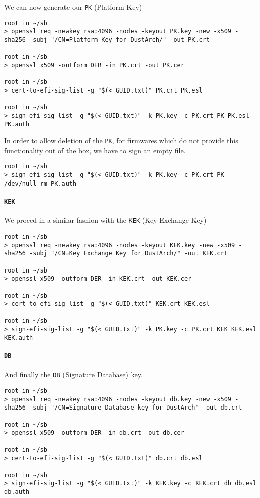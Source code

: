 \documentclass[10pt]{dustdoc}
\begin{document}
We can now generate our \texttt{PK} (Platform Key)

\begin{verbatim}
root in ~/sb
> openssl req -newkey rsa:4096 -nodes -keyout PK.key -new -x509 -sha256 -subj "/CN=Platform Key for DustArch/" -out PK.crt

root in ~/sb
> openssl x509 -outform DER -in PK.crt -out PK.cer

root in ~/sb
> cert-to-efi-sig-list -g "$(< GUID.txt)" PK.crt PK.esl

root in ~/sb
> sign-efi-sig-list -g "$(< GUID.txt)" -k PK.key -c PK.crt PK PK.esl PK.auth
\end{verbatim}


In order to allow deletion of the \texttt{PK}, for firmwares which do not provide this functionality out of the box, we have to sign an empty file.

\begin{verbatim}
root in ~/sb
> sign-efi-sig-list -g "$(< GUID.txt)" -k PK.key -c PK.crt PK /dev/null rm_PK.auth
\end{verbatim}


\paragraph{\texttt{KEK}}%
\label{par:kek}

We proced in a similar fashion with the \texttt{KEK} (Key Exchange Key)

\begin{verbatim}
root in ~/sb
> openssl req -newkey rsa:4096 -nodes -keyout KEK.key -new -x509 -sha256 -subj "/CN=Key Exchange Key for DustArch/" -out KEK.crt

root in ~/sb
> openssl x509 -outform DER -in KEK.crt -out KEK.cer

root in ~/sb
> cert-to-efi-sig-list -g "$(< GUID.txt)" KEK.crt KEK.esl

root in ~/sb
> sign-efi-sig-list -g "$(< GUID.txt)" -k PK.key -c PK.crt KEK KEK.esl KEK.auth
\end{verbatim}


\paragraph{\texttt{DB}}%
\label{par:db}

And finally the \texttt{DB} (Signature Database) key.

\begin{verbatim}
root in ~/sb
> openssl req -newkey rsa:4096 -nodes -keyout db.key -new -x509 -sha256 -subj "/CN=Signature Database key for DustArch" -out db.crt

root in ~/sb
> openssl x509 -outform DER -in db.crt -out db.cer

root in ~/sb
> cert-to-efi-sig-list -g "$(< GUID.txt)" db.crt db.esl

root in ~/sb
> sign-efi-sig-list -g "$(< GUID.txt)" -k KEK.key -c KEK.crt db db.esl db.auth
\end{verbatim}
\end{document}

